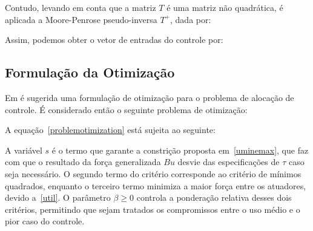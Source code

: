 \documentclass[../main.tex]{subfiles}
\begin{document}
Contudo, levando em conta que a matriz $T$ é uma matriz não quadrática, é aplicada a Moore-Penrose pseudo-inversa $T^{+}$, dada por:
\pseudoinverse

Assim, podemos obter o vetor de entradas do controle por:
\controlinputF

\subsection{Formulação da Otimização}

Em \cite{johansen2005efficient} é sugerida uma formulação de otimização para o problema de alocação de controle. É considerado então o seguinte problema de otimização: 
\problemotimization

A equação~\ref{problemotimization} está sujeita ao seguinte:
\equesujeita
\uminemax
\util

A variável $s$ é o termo que garante a constrição proposta em~\ref{uminemax}, que faz com que o resultado da força generalizada $Bu$ desvie das especificações de $\tau$ caso seja necessário. O segundo termo do critério corresponde ao critério de mínimos quadrados, enquanto o terceiro termo minimiza a maior força entre os atuadores, devido a~\ref{util}. O parâmetro $\beta\ge0$ controla a ponderação relativa desses dois critérios, permitindo que sejam tratados os compromissos entre o uso médio e o pior caso do controle.
\end{document}
